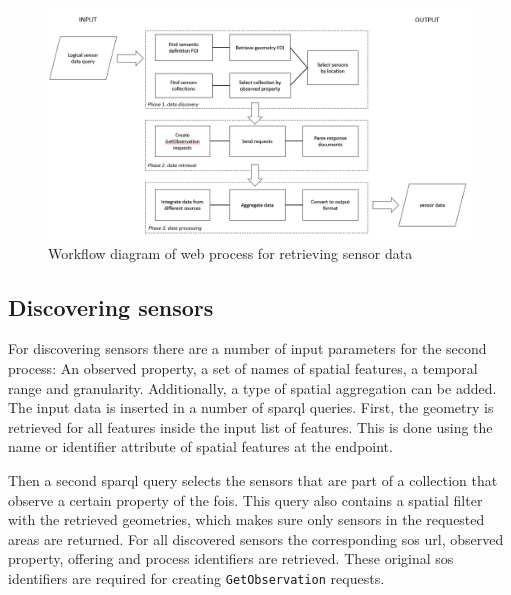 \begin{figure}
	\centering
	\includegraphics[width=1\linewidth]{UML/wps2workflow.png}
	\caption{Workflow diagram of web process for retrieving sensor data}
	\label{fig:WPS2workflow}
\end{figure}

\subsection{Discovering sensors}
\label{par:discover}
For discovering sensors there are a number of input parameters for the second process: An observed property, a set of names of spatial features, a temporal range and granularity. Additionally, a type of spatial aggregation can be added. The input data is inserted in a number of \ac{sparql} queries. First, the geometry is retrieved for all features inside the input list of features. This is done using the name or identifier attribute of spatial features at the endpoint.  

Then a second \ac{sparql} query selects the sensors that are part of a collection that observe a certain property of the \acp{foi}. This query also contains a spatial filter with the retrieved geometries, which makes sure only sensors in the requested areas are returned. For all discovered sensors the corresponding \ac{sos} \ac{url}, observed property, offering and process identifiers are retrieved. These original \ac{sos} identifiers are required for creating \texttt{GetObservation} requests.  

